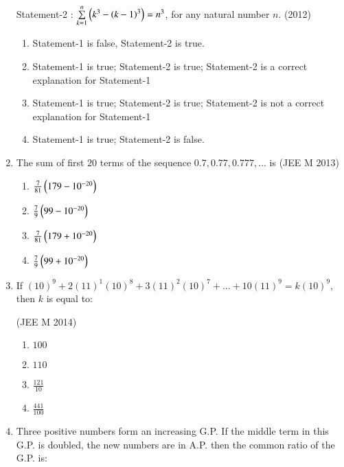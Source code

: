 \documentclass[journal,12pt,twocolumn]{IEEEtran}
\theoremstyle{remark}
\begin{document}
\begin{enumerate}
    Statement-2 : $\sum\limits_{k=1}^n\left(k^3-\left(k-1\right)^3\right)=n^3$, for any natural number $n$.
    \hfill(2012)
    \begin{enumerate}
    \item Statement-1 is false, Statement-2 is true.
    \item Statement-1 is true; Statement-2 is true; Statement-2 is a correct explanation for Statement-1
    \item Statement-1 is true; Statement-2 is true; Statement-2 is not a correct explanation for Statement-1
    \item Statement-1 is true; Statement-2 is false.
    \end{enumerate}
    \item The sum of first $20$ terms of the sequence $0.7,0.77,0.777,\dots$ is 
    \hfill(JEE M 2013)
    
    \begin{enumerate}
    \item$\frac{7}{81}\left(179-10^{-20}\right)$
    \item$\frac{7}{9}\left(99-10^{-20}\right)$
    \item$\frac{7}{81}\left(179+10^{-20}\right)$
    \item$\frac{7}{9}\left(99+10^{-20}\right)$
    \end{enumerate}
    \item If $(10)^9+2(11)^1(10)^8+3(11)^2(10)^7+\dots+10(11)^9=k(10)^9$, then $k$ is equal to:
    
    \hfill(JEE M 2014)
    \begin{enumerate}
    \item$100$
    \item$110$
    \item$\frac{121}{10}$
    \item$\frac{441}{100}$ 
    \end{enumerate}
    \item Three positive numbers form an increasing G.P. If the middle term in this G.P. is doubled, the new numbers are in A.P. then the common ratio of the G.P. is: 
    

\end{enumerate}
\end{document}
